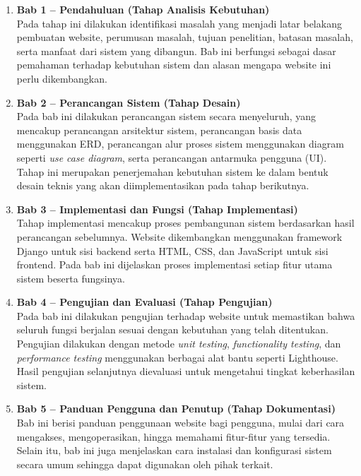 \begin{enumerate}
    \item \textbf{Bab 1 – Pendahuluan (Tahap Analisis Kebutuhan)}\\
    Pada tahap ini dilakukan identifikasi masalah yang menjadi latar belakang pembuatan website, perumusan masalah, tujuan penelitian, batasan masalah, serta manfaat dari sistem yang dibangun. Bab ini berfungsi sebagai dasar pemahaman terhadap kebutuhan sistem dan alasan mengapa website ini perlu dikembangkan.

    \item \textbf{Bab 2 – Perancangan Sistem (Tahap Desain)}\\
    Pada bab ini dilakukan perancangan sistem secara menyeluruh, yang mencakup perancangan arsitektur sistem, perancangan basis data menggunakan ERD, perancangan alur proses sistem menggunakan diagram seperti \textit{use case diagram}, serta perancangan antarmuka pengguna (UI). Tahap ini merupakan penerjemahan kebutuhan sistem ke dalam bentuk desain teknis yang akan diimplementasikan pada tahap berikutnya.

    \item \textbf{Bab 3 – Implementasi dan Fungsi (Tahap Implementasi)}\\
    Tahap implementasi mencakup proses pembangunan sistem berdasarkan hasil perancangan sebelumnya. Website dikembangkan menggunakan framework Django untuk sisi backend serta HTML, CSS, dan JavaScript untuk sisi frontend. Pada bab ini dijelaskan proses implementasi setiap fitur utama sistem beserta fungsinya.

    \item \textbf{Bab 4 – Pengujian dan Evaluasi (Tahap Pengujian)}\\
    Pada bab ini dilakukan pengujian terhadap website untuk memastikan bahwa seluruh fungsi berjalan sesuai dengan kebutuhan yang telah ditentukan. Pengujian dilakukan dengan metode \textit{unit testing}, \textit{functionality testing}, dan \textit{performance testing} menggunakan berbagai alat bantu seperti Lighthouse. Hasil pengujian selanjutnya dievaluasi untuk mengetahui tingkat keberhasilan sistem.

    \item \textbf{Bab 5 – Panduan Pengguna dan Penutup (Tahap Dokumentasi)}\\
    Bab ini berisi panduan penggunaan website bagi pengguna, mulai dari cara mengakses, mengoperasikan, hingga memahami fitur-fitur yang tersedia. Selain itu, bab ini juga menjelaskan cara instalasi dan konfigurasi sistem secara umum sehingga dapat digunakan oleh pihak terkait.


\end{enumerate}
